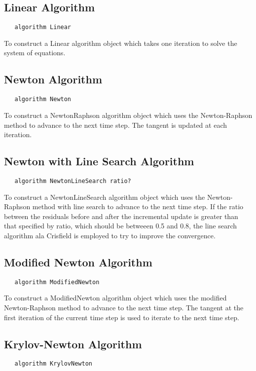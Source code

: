\documentclass[12pt]{article}
\begin{document}
\subsection {Linear Algorithm}
{\sf\small
\begin{verbatim}
   algorithm Linear
\end{verbatim}
}

To construct a Linear algorithm object which takes one iteration to solve
the system of equations.

\subsection {Newton Algorithm}
{\sf\small
\begin{verbatim}
   algorithm Newton
\end{verbatim}
}

To construct a NewtonRaphson algorithm object which uses the Newton-Raphson
method to advance to the next time step. The tangent is updated at
each iteration.


\subsection {Newton with Line Search Algorithm}
{\sf\small
\begin{verbatim}
   algorithm NewtonLineSearch ratio?
\end{verbatim}
}

To construct a NewtonLineSearch algorithm object which uses the Newton-Raphson
method with line search to advance to the next time step. If the
ratio between the residuals before and after the incremental update
is greater than that specified by ratio, which should be betweeen 0.5
and 0.8, the line search algorithm ala Crisfield is employed to try
to improve the convergence. 

\subsection {Modified Newton Algorithm}
{\sf\small
\begin{verbatim}
   algorithm ModifiedNewton
\end{verbatim}
}

To construct a ModifiedNewton algorithm object which uses the modified Newton-Raphson
method to advance to the next time step. The tangent at the first iteration of the current
time step is used to iterate to the next time step.

\subsection {Krylov-Newton Algorithm}
{\sf\small
\begin{verbatim}
   algorithm KrylovNewton
\end{verbatim}
}
\end{document}
